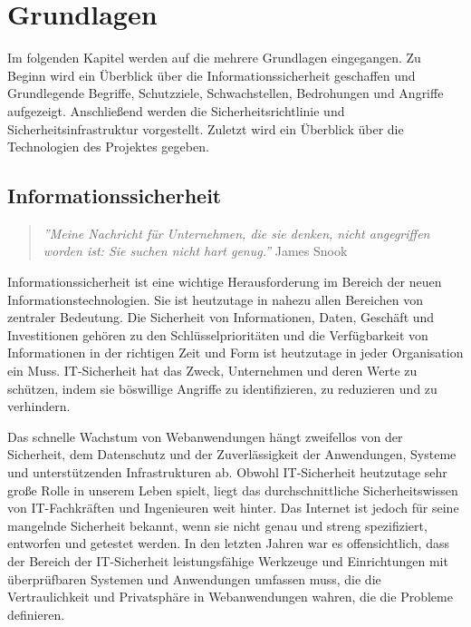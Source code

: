 \chapter{Grundlagen}
\label{chap:k2}

Im folgenden Kapitel werden auf die mehrere Grundlagen eingegangen. Zu Beginn wird ein Überblick über die Informationssicherheit geschaffen und Grundlegende Begriffe, Schutzziele, Schwachstellen, Bedrohungen und Angriffe aufgezeigt. Anschließend werden die Sicherheitsrichtlinie und Sicherheitsinfrastruktur vorgestellt. Zuletzt wird ein Überblick über die Technologien des Projektes gegeben.

\section{Informationssicherheit}

\begin{quote}
	\emph{''Meine Nachricht für Unternehmen, die sie denken, nicht angegriffen worden ist: Sie suchen nicht hart genug.''}
	\hfill James Snook
\end{quote}

Informationssicherheit ist eine wichtige Herausforderung im Bereich der neuen Informationstechnologien. Sie ist heutzutage in nahezu allen Bereichen von zentraler Bedeutung.  Die Sicherheit von Informationen, Daten, Geschäft und Investitionen gehören zu den Schlüsselprioritäten und die Verfügbarkeit von Informationen in der richtigen Zeit und Form ist heutzutage in jeder Organisation ein Muss. IT-Sicherheit hat das Zweck, Unternehmen und deren Werte zu schützen, indem sie böswillige Angriffe zu identifizieren, zu reduzieren und zu verhindern.

Das schnelle Wachstum von Webanwendungen hängt zweifellos von der Sicherheit, dem Datenschutz und der Zuverlässigkeit der Anwendungen, Systeme und unterstützenden Infrastrukturen ab. Obwohl IT-Sicherheit heutzutage sehr große Rolle in unserem Leben spielt, liegt das durchschnittliche Sicherheitswissen von IT-Fachkräften und Ingenieuren weit hinter. Das Internet ist jedoch für seine mangelnde Sicherheit bekannt, wenn sie nicht genau und streng spezifiziert, entworfen und getestet werden. In den letzten Jahren war es offensichtlich, dass der Bereich der IT-Sicherheit leistungsfähige Werkzeuge und Einrichtungen mit überprüfbaren Systemen und Anwendungen umfassen muss, die die Vertraulichkeit und Privatsphäre in Webanwendungen wahren, die die Probleme definieren\cite[1]{furnell2008securing}.

